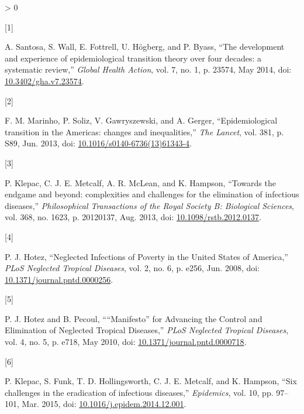 \documentclass[
  oneside]{book}
\newlength{\cslhangindent}
\newlength{\csllabelwidth}
\newenvironment{CSLReferences}[2] %
 {%
  \setlength{\parindent}{0pt}
  \ifodd #1 \everypar{\setlength{\hangindent}{\cslhangindent}}\ignorespaces\fi
  \ifnum #2 > 0
  \setlength{\parskip}{#2\baselineskip}
  \fi
 }%
 {}
\newcommand{\CSLLeftMargin}[1]{\parbox[t]{\csllabelwidth}{#1}}
\newcommand{\CSLRightInline}[1]{\parbox[t]{\linewidth - \csllabelwidth}{#1}\break}
\begin{document}
\setlength{\parskip}{1em}

\hypertarget{refs_intro}{}
\begin{CSLReferences}{0}{0}
\leavevmode\hypertarget{ref-santosa2014}{}%
\CSLLeftMargin{{[}1{]} }
\CSLRightInline{A. Santosa, S. Wall, E. Fottrell, U. Högberg, and P. Byass, {``The development and experience of epidemiological transition theory over four decades: a systematic review,''} \emph{Global Health Action}, vol. 7, no. 1, p. 23574, May 2014, doi: \href{https://doi.org/10.3402/gha.v7.23574}{10.3402/gha.v7.23574}.}

\leavevmode\hypertarget{ref-marinho2013}{}%
\CSLLeftMargin{{[}2{]} }
\CSLRightInline{F. M. Marinho, P. Soliz, V. Gawryszewski, and A. Gerger, {``Epidemiological transition in the Americas: changes and inequalities,''} \emph{The Lancet}, vol. 381, p. S89, Jun. 2013, doi: \href{https://doi.org/10.1016/s0140-6736(13)61343-4}{10.1016/s0140-6736(13)61343-4}.}

\leavevmode\hypertarget{ref-klepac2013}{}%
\CSLLeftMargin{{[}3{]} }
\CSLRightInline{P. Klepac, C. J. E. Metcalf, A. R. McLean, and K. Hampson, {``Towards the endgame and beyond: complexities and challenges for the elimination of infectious diseases,''} \emph{Philosophical Transactions of the Royal Society B: Biological Sciences}, vol. 368, no. 1623, p. 20120137, Aug. 2013, doi: \href{https://doi.org/10.1098/rstb.2012.0137}{10.1098/rstb.2012.0137}.}

\leavevmode\hypertarget{ref-hotez2008}{}%
\CSLLeftMargin{{[}4{]} }
\CSLRightInline{P. J. Hotez, {``Neglected Infections of Poverty in the United States of America,''} \emph{PLoS Neglected Tropical Diseases}, vol. 2, no. 6, p. e256, Jun. 2008, doi: \href{https://doi.org/10.1371/journal.pntd.0000256}{10.1371/journal.pntd.0000256}.}

\leavevmode\hypertarget{ref-hotez2010}{}%
\CSLLeftMargin{{[}5{]} }
\CSLRightInline{P. J. Hotez and B. Pecoul, {``{``}Manifesto{''} for Advancing the Control and Elimination of Neglected Tropical Diseases,''} \emph{PLoS Neglected Tropical Diseases}, vol. 4, no. 5, p. e718, May 2010, doi: \href{https://doi.org/10.1371/journal.pntd.0000718}{10.1371/journal.pntd.0000718}.}

\leavevmode\hypertarget{ref-klepac2015}{}%
\CSLLeftMargin{{[}6{]} }
\CSLRightInline{P. Klepac, S. Funk, T. D. Hollingsworth, C. J. E. Metcalf, and K. Hampson, {``Six challenges in the eradication of infectious diseases,''} \emph{Epidemics}, vol. 10, pp. 97--101, Mar. 2015, doi: \href{https://doi.org/10.1016/j.epidem.2014.12.001}{10.1016/j.epidem.2014.12.001}.}


\end{CSLReferences}
\end{document}
